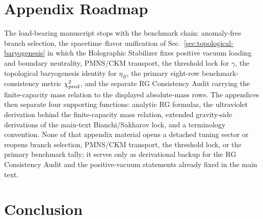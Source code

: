 \documentclass[11pt]{article}
\begin{document}
\section{Appendix Roadmap}

The load-bearing manuscript stops with the benchmark chain: anomaly-free
branch selection, the spacetime--flavor unification of
Sec.~\ref{sec:topological-baryogenesis} in which the Holographic Stabilizer
fixes positive vacuum loading and boundary neutrality, PMNS/CKM transport, the
threshold lock for $\gamma$, the topological baryogenesis identity for
$\eta_B$, the primary eight-row
benchmark-consistency metric $\chi_{\rm pred}^2$, and the separate RG
Consistency Audit carrying the finite-capacity mass relation to the displayed
absolute-mass rows. The appendices then separate four
supporting functions: analytic RG formulas, the ultraviolet derivation behind
the finite-capacity mass relation, extended gravity-side derivations of the
main-text Bianchi/Sakharov lock, and a terminology convention. None of that appendix
material opens a detached tuning sector or reopens branch selection, PMNS/CKM
transport, the threshold lock, or the primary benchmark tally; it serves only
as derivational backup for the RG Consistency Audit and the positive-vacuum
statements already fixed in the main text.

\section{Conclusion}
\end{document}
